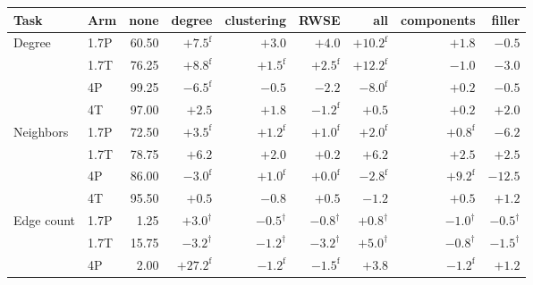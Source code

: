 \documentclass[11pt]{article}
\begin{document}
\begin{table}[t]
\centering\scriptsize
\setlength{\tabcolsep}{3.4pt}
\begin{tabular}{llrrrrrrr}
\toprule
Task & Arm & none & degree & clustering & RWSE & all & components & filler\\
\midrule
Degree & 1.7P & 60.50 & \cellcolor{black!12}$\mathbf{+7.5}^{\mathrm{f}}$ & $+3.0$ & $+4.0$ & \cellcolor{black!12}$\mathbf{+10.2}^{\mathrm{f}}$ & $+1.8$ & $-0.5$\\ %
 & 1.7T & 76.25 & \cellcolor{black!12}$\mathbf{+8.8}^{\mathrm{f}}$ & $+1.5^{\mathrm{f}}$ & $+2.5^{\mathrm{f}}$ & \cellcolor{black!12}$\mathbf{+12.2}^{\mathrm{f}}$ & $-1.0$ & $-3.0$\\ %
 & 4P & 99.25 & \cellcolor{black!12}$\mathbf{-6.5}^{\mathrm{f}}$ & $-0.5$ & $\mathbf{-2.2}$ & \cellcolor{black!12}$\mathbf{-8.0}^{\mathrm{f}}$ & $+0.2$ & $-0.5$\\ %
 & 4T & 97.00 & \cellcolor{black!12}$+2.5$ & $+1.8$ & $-1.2^{\mathrm{f}}$ & \cellcolor{black!12}$+0.5$ & $+0.2$ & $+2.0$\\ %
\addlinespace[2pt]
Neighbors & 1.7P & 72.50 & $+3.5^{\mathrm{f}}$ & $+1.2^{\mathrm{f}}$ & $+1.0^{\mathrm{f}}$ & $+2.0^{\mathrm{f}}$ & $+0.8^{\mathrm{f}}$ & $\mathbf{-6.2}$\\ %
 & 1.7T & 78.75 & $\mathbf{+6.2}$ & $+2.0$ & $+0.2$ & $\mathbf{+6.2}$ & $+2.5$ & $+2.5$\\ %
 & 4P & 86.00 & $-3.0^{\mathrm{f}}$ & $+1.0^{\mathrm{f}}$ & $+0.0^{\mathrm{f}}$ & $-2.8^{\mathrm{f}}$ & $\mathbf{+9.2}^{\mathrm{f}}$ & $\mathbf{-12.5}$\\ %
 & 4T & 95.50 & $+0.5$ & $-0.8$ & $+0.5$ & $-1.2$ & $+0.5$ & $+1.2$\\ %
\addlinespace[2pt]
Edge count & 1.7P & 1.25 & \cellcolor{black!12}$+3.0^{\dagger}$ & $-0.5^{\dagger}$ & $-0.8^{\dagger}$ & \cellcolor{black!12}$+0.8^{\dagger}$ & $-1.0^{\dagger}$ & $-0.5^{\dagger}$\\ %
 & 1.7T & 15.75 & \cellcolor{black!12}$-3.2^{\dagger}$ & $-1.2^{\dagger}$ & $-3.2^{\dagger}$ & \cellcolor{black!12}$+5.0^{\dagger}$ & $-0.8^{\dagger}$ & $-1.5^{\dagger}$\\ %
 & 4P & 2.00 & \cellcolor{black!12}$\mathbf{+27.2}^{\mathrm{f}}$ & $-1.2^{\mathrm{f}}$ & $-1.5^{\mathrm{f}}$ & \cellcolor{black!12}$\mathbf{+3.8}$ & $-1.2^{\mathrm{f}}$ & $+1.2$\\ %

\end{tabular}
\end{table}
\end{document}
